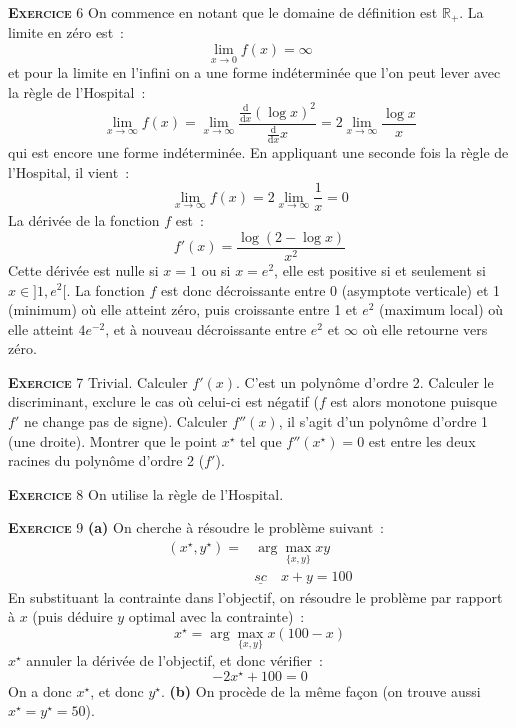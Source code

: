 \documentclass[10pt,a4paper,notitlepage]{article}
\newcommand{\exercice}[1]{\textsc{\textbf{Exercice}} #1}
\begin{document}
\exercice{6} On commence en notant que le domaine de définition est
$\mathbb R_+$. La limite en zéro est :
\[
\lim_{x\rightarrow 0} f(x) = \infty
\]
et pour la limite en l'infini on a une forme indéterminée que l'on
peut lever avec la règle de l'Hospital :
\[
\lim_{x\rightarrow \infty} f(x) = \lim_{x\rightarrow \infty}
\frac{\frac{\mathrm d}{\mathrm dx} (\log x)^2}{\frac{\mathrm
    d}{\mathrm dx} x} = 2\lim_{x\rightarrow \infty} \frac{\log x}{x}
\]
qui est encore une forme indéterminée. En appliquant une seconde fois
la règle de l'Hospital, il  vient :
\[
\lim_{x\rightarrow \infty} f(x) =  2\lim_{x\rightarrow \infty}
\frac{1}{x} = 0
\]
La dérivée de la fonction $f$ est :
\[
f'(x) = \frac{\log (2-\log x)}{x^2}
\]
Cette dérivée est nulle si $x=1$ ou si $x=e^2$, elle est positive si
et seulement si $x\in]1,e^2[$. La fonction $f$ est donc décroissante
entre 0 (asymptote verticale) et 1 (minimum) où elle atteint zéro,
puis croissante entre 1 et $e^2$ (maximum local) où elle atteint
$4e^{-2}$, et à nouveau décroissante entre $e^2$ et $\infty$ où elle
retourne vers zéro.

\bigskip

\exercice{7} Trivial. Calculer $f'(x)$. C'est un polynôme d'ordre
2. Calculer le discriminant, exclure le cas où celui-ci est négatif
($f$ est alors monotone puisque $f'$ ne change pas de signe). Calculer
$f''(x)$, il s'agit d'un polynôme d'ordre 1 (une droite). Montrer que
le point $x^{\star}$ tel que $f''(x^{\star})=0$ est entre les deux
racines du polynôme d'ordre 2 ($f'$).

\bigskip

\exercice{8} On utilise la règle de l'Hospital.

\bigskip

\exercice{9} \textbf{(a)} On cherche à résoudre le problème suivant :
\[
\begin{split}
(x^{\star},y^{\star}) = &\arg\max_{\{x,y\}}xy\\
&\underline{sc}\quad x+y=100
\end{split}
\]
En substituant la contrainte dans l'objectif, on résoudre le problème
par rapport à $x$ (puis déduire $y$ optimal avec la contrainte) :
\[
x^{\star} = \arg\max_{\{x,y\}}x(100-x)
\]
$x^{\star}$ annuler la dérivée de l'objectif, et donc vérifier :
\[
-2x^{\star}+100 = 0
\]
On a donc $x^{\star}$, et donc $y^{\star}$. \textbf{(b)} On procède de
la même façon (on trouve aussi $x^{\star}=y^{\star}=50$).
\end{document}
